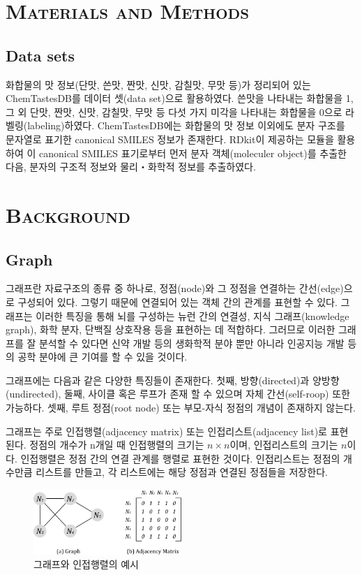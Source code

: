 \documentclass[9pt]{ieeeconf}
\begin{document}
\section[short]{\Large {\textsc{Materials and Methods}}}
\subsection[short]{\large {Data sets}}
화합물의 맛 정보(단맛, 쓴맛, 짠맛, 신맛, 감칠맛, 무맛 등)가 정리되어 있는 ChemTastesDB\cite{rojas2022chemtastesdb}를 데이터 셋(data set)으로 활용하였다. 쓴맛을 나타내는 화합물을 1, 그 외 단맛, 짠맛, 신맛, 감칠맛, 무맛 등 다섯 가지 미각을 나타내는 화합물을 0으로 라벨링(labeling)하였다.
ChemTastesDB에는 화합물의 맛 정보 이외에도 분자 구조를 문자열로 표기한 canonical SMILES 정보가 존재한다. RDkit이 제공하는 모듈을 활용하여 이 canonical SMILES 표기로부터 먼저 분자 객체(moleculer object)를 추출한 다음, 분자의 구조적 정보와 물리‧화학적 정보를 추출하였다.

\section[short]{\Large {\textsc{Background}}}
\subsection[short]{\large {Graph}}
\indent 그래프란 자료구조의 종류 중 하나로, 정점(node)와 그 정점을 연결하는 간선(edge)으로 구성되어 있다.
그렇기 때문에 연결되어 있는 객체 간의 관계를 표현할 수 있다. 그래프는 이러한 특징을 통해 뇌를 구성하는 뉴런 간의 연결성, 지식 그래프(knowledge graph), 화학 분자, 단백질 상호작용 등을 표현하는 데 적합하다.
그러므로 이러한 그래프를 잘 분석할 수 있다면 신약 개발 등의 생화학적 분야 뿐만 아니라 인공지능 개발 등의 공학 분야에 큰 기여를 할 수 있을 것이다.

\indent 그래프에는 다음과 같은 다양한 특징들이 존재한다. 첫째, 방향(directed)과 양방향(undirected), 둘째, 사이클 혹은 루프가 존재 할 수 있으며 자체 간선(self-roop) 또한 가능하다.
셋째, 루트 정점(root node) 또는 부모-자식 정점의 개념이 존재하지 않는다.

\indent 그래프는 주로 인접행렬(adjacency matrix) 또는 인접리스트(adjacency list)로 표현된다. 정점의 개수가 n개일 때 인접행렬의 크기는 $n \times n$이며, 인접리스트의 크기는 $n$이다. 인접행렬은 정점 간의 연결 관계를 행렬로 표현한 것이다. 인접리스트는 정점의 개수만큼 리스트를 만들고, 각 리스트에는 해당 정점과 연결된 정점들을 저장한다.
\begin{figure}[h]
    \centering
    \includegraphics[width=0.5\textwidth]{./images/adjacency_matrix.png}
    \caption{그래프와 인접행렬의 예시}
\end{figure}





\end{document}
